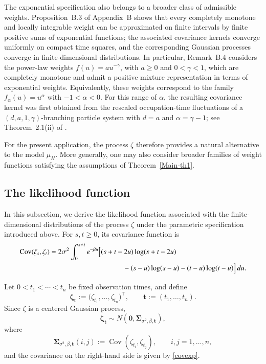\documentclass[preprint,12pt,authoryear]{elsarticle}
\begin{document}
The exponential specification also belongs to a broader class of
admissible weights. Proposition~B.3 of Appendix~B shows that every
completely monotone and locally integrable weight can be approximated on
finite intervals by finite positive sums of exponential functions; the
associated covariance kernels converge uniformly on compact time
squares, and the corresponding Gaussian processes converge in
finite-dimensional distributions. In particular, Remark~B.4 considers
the power-law weights \(f(u)=a u^{-\gamma}\), with \(a\geq0\) and
\(0<\gamma<1\), which are completely monotone and admit a positive
mixture representation in terms of exponential weights. Equivalently,
these weights correspond to the family \(f_\alpha(u)=u^\alpha\) with
\(-1<\alpha<0\). For this range of \(\alpha\), the resulting covariance
kernel was first obtained from the rescaled occupation-time fluctuations
of a \((d,a,1,\gamma)\)-branching particle system with \(d=a\) and
\(\alpha=\gamma-1\); see Theorem~2.1(ii) of \cite{LMR2024}.


For the present application, the process $\zeta$ therefore provides a natural alternative to the model $\mu_H$. More generally, one may also consider broader families of weight functions satisfying the assumptions of Theorem~\ref{Main-th1}.




\subsection{The likelihood function}\label{subsec:likelihood}

In this subsection, we derive the likelihood function associated with the
finite-dimensional distributions of the process \(\zeta\) under the
parametric specification introduced above. For \(s,t\geq0\), its covariance
function is
\begin{equation}\label{covexp}
\begin{aligned}
\operatorname{Cov}(\zeta_s,\zeta_t)
={}&
2\sigma^2
\int_0^{s\wedge t}
e^{-\beta u}
\Big[
(s+t-2u)\log(s+t-2u) \\
&\hspace{3.2cm}
-(s-u)\log(s-u)
-(t-u)\log(t-u)
\Big]\,du .
\end{aligned}
\end{equation}

Let \(0<t_1<\cdots<t_n\) be fixed observation times, and define
\[
\bm\zeta_{\bm t}
:=
\big(\zeta_{t_1},\ldots,\zeta_{t_n}\big)^\top,
\qquad
\bm t:=(t_1,\ldots,t_n).
\]
Since \(\zeta\) is a centered Gaussian process,
\[
\bm\zeta_{\bm t}
\sim
N\!\left(
\bm 0,
\bm\Sigma_{\sigma^2,\beta,\bm t}
\right),
\]
where
\[
\bm\Sigma_{\sigma^2,\beta,\bm t}(i,j)
:=
\operatorname{Cov}(\zeta_{t_i},\zeta_{t_j}),
\qquad i,j=1,\ldots,n,
\]
and the covariance on the right-hand side is given by
\eqref{covexp}.
\end{document}
